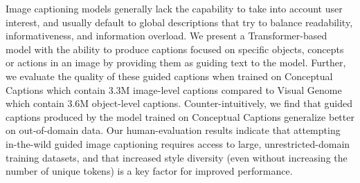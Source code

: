 Image captioning models generally lack the capability to take into account user interest, and usually default to global descriptions that try to balance readability, informativeness, and information overload. We present a Transformer-based model with the ability to produce captions focused on specific objects, concepts or actions in an image by providing them as guiding text to the model. Further, we evaluate the quality of these guided captions when trained on Conceptual Captions which contain 3.3M image-level captions compared to Visual Genome which contain 3.6M object-level captions. Counter-intuitively, we find that guided captions produced by the model trained on Conceptual Captions generalize better on out-of-domain data. Our human-evaluation results indicate that attempting in-the-wild guided image captioning requires access to large, unrestricted-domain training datasets, and that increased style diversity (even without increasing the number of unique tokens) is a key factor for improved performance.

